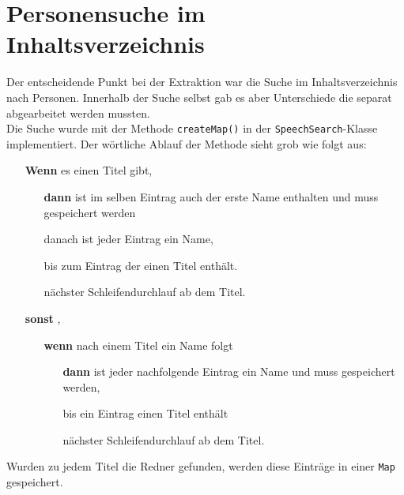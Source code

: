 \section{Personensuche im Inhaltsverzeichnis}
Der entscheidende Punkt bei der Extraktion war die Suche im Inhaltsverzeichnis nach Personen. Innerhalb der Suche selbst gab es aber Unterschiede die separat abgearbeitet werden mussten.\\
Die Suche wurde mit der Methode \lstinline|createMap()| in der \lstinline|SpeechSearch|-Klasse implementiert. Der wörtliche Ablauf der Methode sieht grob wie folgt aus:
\begin{itemize}[leftmargin=3.5em]
	\item[\textbf{Wenn}] es einen Titel  gibt,
	\begin{itemize}
		\item[\textbf{dann}] ist im selben Eintrag auch der erste Name enthalten und muss gespeichert werden
		\item[] danach ist jeder Eintrag ein Name,
		\item[] bis zum Eintrag der einen Titel enthält.
		\item[] nächster Schleifendurchlauf ab dem Titel.
	\end{itemize}
	\item[\textbf{sonst}] ,
	\begin{itemize}
		\item[\textbf{wenn}] nach einem Titel ein Name folgt
		\begin{itemize}
			\item[\textbf{dann}] ist jeder nachfolgende Eintrag ein Name und muss gespeichert werden,
			\item[] bis ein Eintrag einen Titel enthält
			\item[] nächster Schleifendurchlauf ab dem Titel.
		\end{itemize}
	\end{itemize}
\end{itemize}
Wurden zu jedem Titel die Redner gefunden, werden diese Einträge in einer \lstinline|Map| gespeichert.

